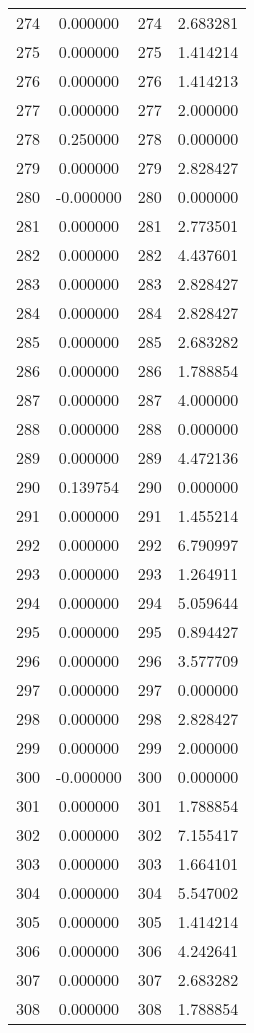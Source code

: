 \documentclass[12pt]{article}
\begin{document}
\begin{longtable}{@{}cccc@{}}
274 & 0.000000 & 274 & 2.683281 \\
275 & 0.000000 & 275 & 1.414214 \\
276 & 0.000000 & 276 & 1.414213 \\
277 & 0.000000 & 277 & 2.000000 \\
278 & 0.250000 & 278 & 0.000000 \\
279 & 0.000000 & 279 & 2.828427 \\
280 & -0.000000 & 280 & 0.000000 \\
281 & 0.000000 & 281 & 2.773501 \\
282 & 0.000000 & 282 & 4.437601 \\
283 & 0.000000 & 283 & 2.828427 \\
284 & 0.000000 & 284 & 2.828427 \\
285 & 0.000000 & 285 & 2.683282 \\
286 & 0.000000 & 286 & 1.788854 \\
287 & 0.000000 & 287 & 4.000000 \\
288 & 0.000000 & 288 & 0.000000 \\
289 & 0.000000 & 289 & 4.472136 \\
290 & 0.139754 & 290 & 0.000000 \\
291 & 0.000000 & 291 & 1.455214 \\
292 & 0.000000 & 292 & 6.790997 \\
293 & 0.000000 & 293 & 1.264911 \\
294 & 0.000000 & 294 & 5.059644 \\
295 & 0.000000 & 295 & 0.894427 \\
296 & 0.000000 & 296 & 3.577709 \\
297 & 0.000000 & 297 & 0.000000 \\
298 & 0.000000 & 298 & 2.828427 \\
299 & 0.000000 & 299 & 2.000000 \\
300 & -0.000000 & 300 & 0.000000 \\
301 & 0.000000 & 301 & 1.788854 \\
302 & 0.000000 & 302 & 7.155417 \\
303 & 0.000000 & 303 & 1.664101 \\
304 & 0.000000 & 304 & 5.547002 \\
305 & 0.000000 & 305 & 1.414214 \\
306 & 0.000000 & 306 & 4.242641 \\
307 & 0.000000 & 307 & 2.683282 \\
308 & 0.000000 & 308 & 1.788854 \\

\end{longtable}
\end{document}
